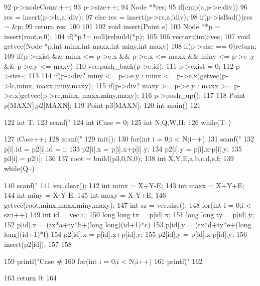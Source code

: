 \documentclass[11pt]{article}
\begin{document}
\begin{Code}
{{ 92              p->nodeCount++;
 93              p->size++;
 94              Node **res;
 95              if(cmp(a,p->e,div))
 96                  res = insert(p->lc,a,!div);
 97              else res = insert(p->rc,a,!div);
 98              if(p->isBad())res = &p;
 99              return res;
100       }
101   }
102   void insert(Point e){
103       Node **p = insert(root,e,0);
104       if(*p != null)rebuild(*p);
105   }
106   vector<int>vec;
107   void getvec(Node *p,int minx,int maxx,int miny,int maxy){
108       if(p->size == 0)return;
109       if(p->exist && minx <= p->e.x && p->e.x <= maxx && miny <= p->e
             .y && p->e.y <= maxy){
110           vec.push_back(p->e.id);
111           p->exist = 0;
112           p->size--;
113       }
114       if(p->div? miny <= p->e.y : minx <= p->e.x)getvec(p->lc,minx,
             maxx,miny,maxy);
115       if(p->div? maxy >= p->e.y : maxx >= p->e.x)getvec(p->rc,minx,
             maxx,miny,maxy);
116       p->push_up();
117   }
118   Point p[MAXN],p2[MAXN];
119   Point p3[MAXN];
120   int main()
121   {
122       int T;
123       scanf("%
124       int iCase = 0;
125       int N,Q,W,H;
126       while(T--){
127           iCase++;
128           scanf("%
129           init();
130           for(int i = 0;i < N;i++){
131               scanf("%
132               p[i].id = p2[i].id = i;
133               p2[i].x = p[i].x+p[i].y;
134               p2[i].y = p[i].x-p[i].y;
135               p3[i] = p2[i];
136           }
137           root = build(p3,0,N,0);
138           int X,Y,E,a,b,c,d,e,f;
139           while(Q--){


140                scanf("%
141                vec.clear();
142                int minx = X+Y-E;
143                int maxx = X+Y+E;
144                int miny = X-Y-E;
145                int maxy = X-Y+E;
146                getvec(root,minx,maxx,miny,maxy);
147                int sz = vec.size();
148                for(int i = 0;i < sz;i++){
149                    int id = vec[i];
150                    long long tx = p[id].x;
151                    long long ty = p[id].y;
152                    p[id].x = (tx*a+ty*b+(long long)(id+1)*c)%
153                    p[id].y = (tx*d+ty*e+(long long)(id+1)*f)%
154                    p2[id].x = p[id].x+p[id].y;
155                    p2[id].y = p[id].x-p[id].y;
156                    insert(p2[id]);
157                }
158            }
159            printf("Case #%
160            for(int i = 0;i < N;i++)
161                printf("%
162     }
163     return 0;
164 }
\end{Code}
\end{document}
